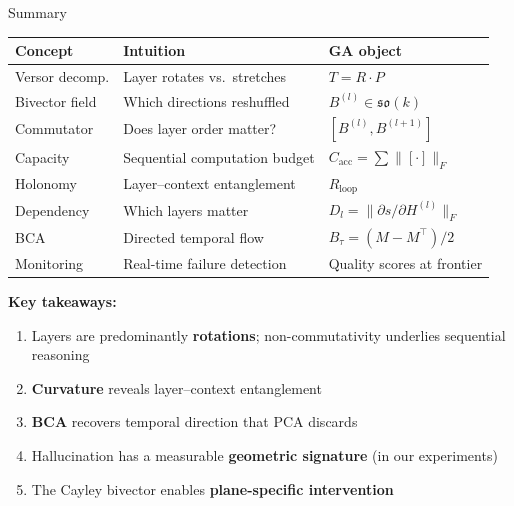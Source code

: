 \documentclass[aspectratio=169, 11pt]{beamer}
\begin{document}
\begin{frame}{Summary}
\vspace{-0.6em}
\renewcommand{\arraystretch}{1.0}
\begin{center}\scriptsize
\begin{tabular}{@{} l l l @{}}
\toprule
\textbf{Concept} & \textbf{Intuition} & \textbf{GA object} \\
\midrule
Versor decomp. & Layer rotates vs.\ stretches & $T = R \cdot P$ \\
Bivector field & Which directions reshuffled & $B^{(l)} \in \mathfrak{so}(k)$ \\
Commutator & Does layer order matter? & $[B^{(l)}, B^{(l+1)}]$ \\
Capacity & Sequential computation budget & $C_{\text{acc}} = \sum \|[\cdot]\|_F$ \\
Holonomy & Layer--context entanglement & $R_{\text{loop}}$ \\
Dependency & Which layers matter & $D_l = \|\partial s / \partial H^{(l)}\|_F$ \\
BCA & Directed temporal flow & $B_\tau = (M - M^\top)/2$ \\
Monitoring & Real-time failure detection & Quality scores at frontier \\
\bottomrule
\end{tabular}
\end{center}

\vspace{0.1em}
\textbf{Key takeaways:}\vspace{-0.3em}
\begin{enumerate}\small\setlength{\itemsep}{1pt}
  \item Layers are predominantly \textbf{rotations}; non-commutativity underlies sequential reasoning
  \item \textbf{Curvature} reveals layer--context entanglement
  \item \textbf{BCA} recovers temporal direction that PCA discards
  \item Hallucination has a measurable \textbf{geometric signature} (in our experiments)
  \item The Cayley bivector enables \textbf{plane-specific intervention}
\end{enumerate}
\end{frame}
\end{document}
